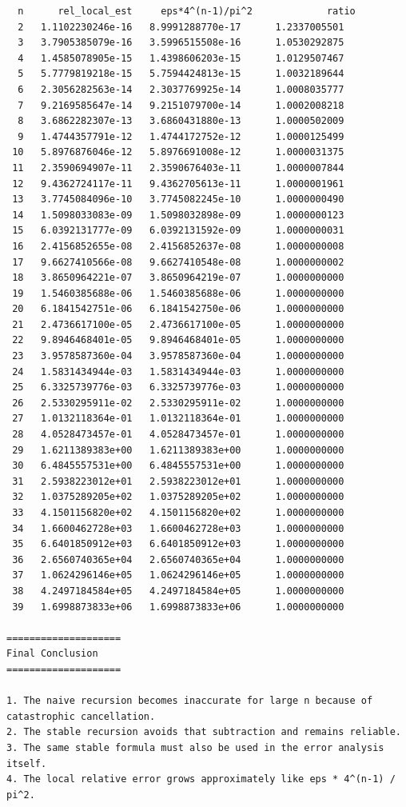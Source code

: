 \documentclass[12pt,a4paper]{article}
\begin{document}
\begin{lstlisting}
  n      rel_local_est     eps*4^(n-1)/pi^2             ratio
  2   1.1102230246e-16   8.9991288770e-17      1.2337005501
  3   3.7905385079e-16   3.5996515508e-16      1.0530292875
  4   1.4585078905e-15   1.4398606203e-15      1.0129507467
  5   5.7779819218e-15   5.7594424813e-15      1.0032189644
  6   2.3056282563e-14   2.3037769925e-14      1.0008035777
  7   9.2169585647e-14   9.2151079700e-14      1.0002008218
  8   3.6862282307e-13   3.6860431880e-13      1.0000502009
  9   1.4744357791e-12   1.4744172752e-12      1.0000125499
 10   5.8976876046e-12   5.8976691008e-12      1.0000031375
 11   2.3590694907e-11   2.3590676403e-11      1.0000007844
 12   9.4362724117e-11   9.4362705613e-11      1.0000001961
 13   3.7745084096e-10   3.7745082245e-10      1.0000000490
 14   1.5098033083e-09   1.5098032898e-09      1.0000000123
 15   6.0392131777e-09   6.0392131592e-09      1.0000000031
 16   2.4156852655e-08   2.4156852637e-08      1.0000000008
 17   9.6627410566e-08   9.6627410548e-08      1.0000000002
 18   3.8650964221e-07   3.8650964219e-07      1.0000000000
 19   1.5460385688e-06   1.5460385688e-06      1.0000000000
 20   6.1841542751e-06   6.1841542750e-06      1.0000000000
 21   2.4736617100e-05   2.4736617100e-05      1.0000000000
 22   9.8946468401e-05   9.8946468401e-05      1.0000000000
 23   3.9578587360e-04   3.9578587360e-04      1.0000000000
 24   1.5831434944e-03   1.5831434944e-03      1.0000000000
 25   6.3325739776e-03   6.3325739776e-03      1.0000000000
 26   2.5330295911e-02   2.5330295911e-02      1.0000000000
 27   1.0132118364e-01   1.0132118364e-01      1.0000000000
 28   4.0528473457e-01   4.0528473457e-01      1.0000000000
 29   1.6211389383e+00   1.6211389383e+00      1.0000000000
 30   6.4845557531e+00   6.4845557531e+00      1.0000000000
 31   2.5938223012e+01   2.5938223012e+01      1.0000000000
 32   1.0375289205e+02   1.0375289205e+02      1.0000000000
 33   4.1501156820e+02   4.1501156820e+02      1.0000000000
 34   1.6600462728e+03   1.6600462728e+03      1.0000000000
 35   6.6401850912e+03   6.6401850912e+03      1.0000000000
 36   2.6560740365e+04   2.6560740365e+04      1.0000000000
 37   1.0624296146e+05   1.0624296146e+05      1.0000000000
 38   4.2497184584e+05   4.2497184584e+05      1.0000000000
 39   1.6998873833e+06   1.6998873833e+06      1.0000000000

====================
Final Conclusion
====================

1. The naive recursion becomes inaccurate for large n because of catastrophic cancellation.
2. The stable recursion avoids that subtraction and remains reliable.
3. The same stable formula must also be used in the error analysis itself.
4. The local relative error grows approximately like eps * 4^(n-1) / pi^2.
\end{lstlisting}
\end{document}
